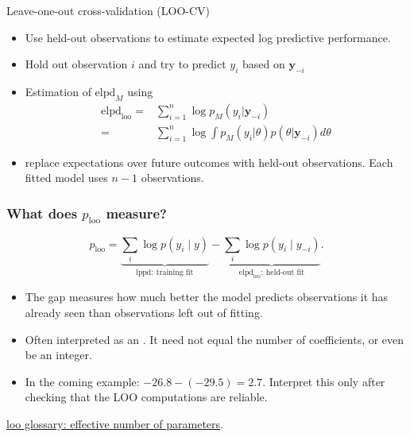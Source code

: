 \documentclass[10pt]{beamer}
\begin{document}
\begin{frame}{Leave-one-out cross-validation (LOO-CV)}

\begin{itemize}
\item Use held-out observations to estimate expected log predictive performance.
\pause
\item Hold out observation $i$ and try to predict $y_i$ based on $\mathbf{y}_{-i}$
\item Estimation of $\text{elpd}_M$ using 
\small
\begin{align*}
\text{elpd}_\text{loo} = & \sum^n_{i=1} \log p_M(y_i|\mathbf{y}_{-i}) \\
 = & \sum^n_{i=1} \log \int p_M(y_i|\theta) p(\theta|\mathbf{y}_{-i})d\theta
\end{align*}
\pause
\item {} replace expectations over future outcomes with held-out
  observations. Each fitted model uses $n-1$ observations.
\end{itemize}
\end{frame}

\begin{frame}
\frametitle{What does $p_{\mathrm{loo}}$ measure?}

  \[
    p_{\mathrm{loo}}=
    \underbrace{\sum_i\log p(y_i\mid y)}_{\mathrm{lppd}:\ \text{training fit}}
    -\underbrace{\sum_i\log p(y_i\mid y_{-i})}_{\mathrm{elpd}_{\mathrm{loo}}:\ \text{held-out fit}}.
  \]
  \begin{itemize}
  \item<1-> The gap measures how much better the model predicts observations
    it has already seen than observations left out of fitting.
  \item<2-> Often interpreted as an .
    It need not equal the number of coefficients, or even be an integer.
  \item<3-> In the coming example: $-26.8-(-29.5)=2.7$.
    Interpret this only after checking that the LOO computations are reliable.
  \end{itemize}
  {\scriptsize \href{https://mc-stan.org/loo/reference/loo-glossary.html}{loo glossary: effective number of parameters}.}
\end{frame}
\end{document}
